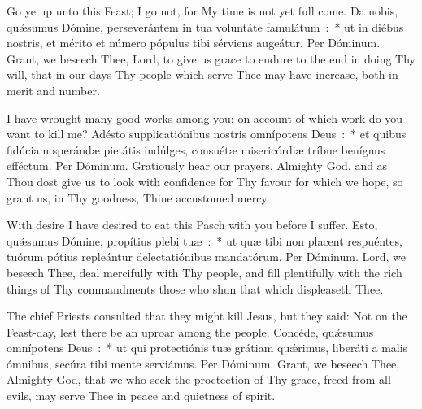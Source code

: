 {{  {%
  {Go ye up unto this Feast; I go not, for My time is not yet full come.}
  {Da nobis, quǽsumus Dómine, perseverántem in tua voluntáte famulátum~:~* ut in diébus nostris, et mérito et número pópulus tibi sérviens augeátur. Per Dóminum.}
  {Grant, we beseech Thee, Lord, to give us grace to endure to the end in doing Thy will, that in our days Thy people which serve Thee may have increase, both in merit and number.}
  }

  {I have wrought many good works among you: on account of which work do you want to kill me?}
  {Adésto supplicatiónibus nostris omnípotens Deus~:~* et quibus fidúciam sperándæ pietátis indúlges, consuétæ misericórdiæ tríbue benígnus efféctum. Per Dóminum.}
  {Gratiously hear our prayers, Almighty God, and as Thou dost give us to look with confidence for Thy favour for which we hope, so grant us, in Thy goodness, Thine accustomed mercy.}

  {With desire I have desired to eat this Pasch with you before I suffer.}
  {Esto, quǽsumus Dómine, propítius plebi tuæ~:~* ut quæ tibi non placent respuéntes, tuórum pótius repleántur delectatiónibus mandatórum. Per Dóminum.}
  {Lord, we beseech Thee, deal mercifully with Thy people, and fill plentifully with the rich things of Thy commandments those who shun that which displeaseth Thee.}

  \let\vrtitle=\undefined
  {The chief Priests consulted that they might kill Jesus, but they said: Not on the Feast-day, lest there be an uproar among the people.}
  {Concéde, quǽsumus omnípotens Deus~:~* ut qui protectiónis tuæ grátiam quǽrimus, liberáti a malis ómnibus, secúra tibi mente serviámus. Per Dóminum.}
  {Grant, we beseech Thee, Almighty God, that we who seek the proctection of Thy grace, freed from all evils, may serve Thee in peace and quietness of spirit.}
}
}
